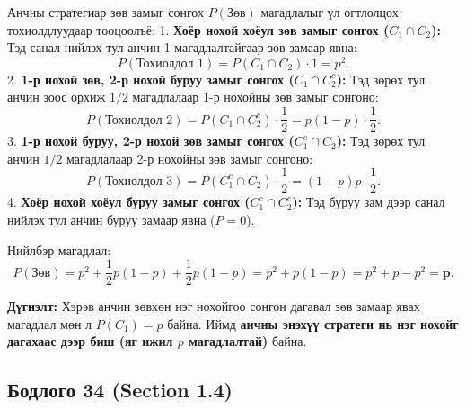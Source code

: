 \documentclass[11pt,a4paper]{article}
\begin{document}
Анчны стратегиар зөв замыг сонгох $P(\text{Зөв})$ магадлалыг үл огтлолцох тохиолдлуудаар тооцоолъё:
1. 				\textbf{Хоёр нохой хоёул зөв замыг сонгох ($C_1 \cap C_2$):}
   Тэд санал нийлэх тул анчин 1 магадлалтайгаар зөв замаар явна:
   \[
     P(\text{Тохиолдол 1}) = P(C_1 \cap C_2) \cdot 1 = p^2.
   \]
2. 				\textbf{1-р нохой зөв, 2-р нохой буруу замыг сонгох ($C_1 \cap C_2^c$):}
   Тэд зөрөх тул анчин зоос орхиж $1/2$ магадлалаар 1-р нохойны зөв замыг сонгоно:
   \[
     P(\text{Тохиолдол 2}) = P(C_1 \cap C_2^c) \cdot \frac{1}{2} = p(1 - p) \cdot \frac{1}{2}.
   \]
3. 				\textbf{1-р нохой буруу, 2-р нохой зөв замыг сонгох ($C_1^c \cap C_2$):}
   Тэд зөрөх тул анчин $1/2$ магадлалаар 2-р нохойны зөв замыг сонгоно:
   \[
     P(\text{Тохиолдол 3}) = P(C_1^c \cap C_2) \cdot \frac{1}{2} = (1 - p)p \cdot \frac{1}{2}.
   \]
4. 				\textbf{Хоёр нохой хоёул буруу замыг сонгох ($C_1^c \cap C_2^c$):}
   Тэд буруу зам дээр санал нийлэх тул анчин буруу замаар явна ($P = 0$).

Нийлбэр магадлал:
\[
  P(\text{Зөв}) = p^2 + \frac{1}{2}p(1 - p) + \frac{1}{2}p(1 - p) = p^2 + p(1 - p) = p^2 + p - p^2 = \mathbf{p}.
\]

				\textbf{Дүгнэлт:}
Хэрэв анчин зөвхөн нэг нохойгоо сонгон дагавал зөв замаар явах магадлал мөн л $P(C_1) = p$ байна.
Иймд 				\textbf{анчны энэхүү стратеги нь нэг нохойг дагахаас дээр биш (яг ижил $p$ магадлалтай)} байна.

\vspace{0.8em}

\subsection*{Бодлого 34 (Section 1.4)}
\end{document}
